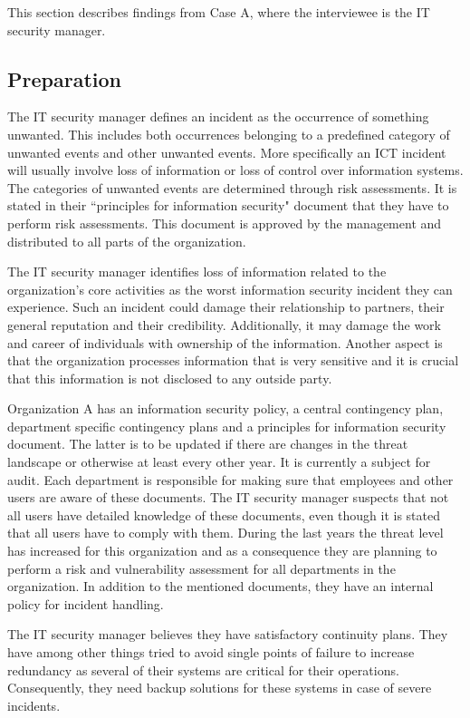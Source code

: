 This section describes findings from Case A, where the interviewee is the IT security manager.

\subsection{Preparation}
The IT security manager defines an incident as the occurrence of something unwanted. This includes both occurrences belonging to a predefined category of unwanted events and other unwanted events. More specifically an \ac{ICT} incident will usually involve loss of information or loss of control over information systems. The categories of unwanted events are determined through risk assessments. It is stated in their ``principles for information security" document that they have to perform risk assessments. This document is approved by the management and distributed to all parts of the organization. 

The IT security manager identifies loss of information related to the organization's core activities as the worst information security incident they can experience. Such an incident could damage their relationship to partners, their general reputation and their credibility. Additionally, it may damage the work and career of individuals with ownership of the information. Another aspect is that the organization processes information that is very sensitive and it is crucial that this information is not disclosed to any outside party. 

Organization A has an information security policy, a central contingency plan, department specific contingency plans and a principles for information security document. The latter is to be updated if there are changes in the threat landscape or otherwise at least every other year. It is currently a subject for audit. Each department is responsible for making sure that employees and other users are aware of these documents. The IT security manager suspects that not all users have detailed knowledge of these documents, even though it is stated that all users have to comply with them. During the last years the threat level has increased for this organization and as a consequence they are planning to perform a risk and vulnerability assessment for all departments in the organization. In addition to the mentioned documents, they have an internal policy for incident handling.

The IT security manager believes they have satisfactory continuity plans. They have among other things tried to avoid single points of failure to increase redundancy as several of their systems are critical for their operations. Consequently, they need backup solutions for these systems in case of severe incidents. 

